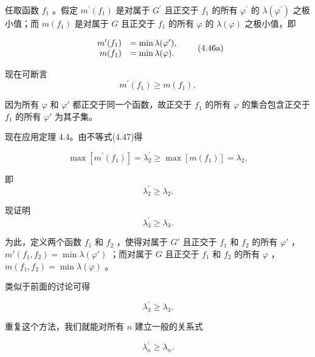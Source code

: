 任取函数 $f_{1}$ 。假定 $m^{\prime}(f_{1})$ 是对属于 $G^{\prime}$ 且正交于 $f_{1}$ 的所有 $\varphi^{\prime}$ 的 $\lambda (\varphi^{\prime})$ 之极小值；而 $m(f_{1})$ 是对属于 $G$ 且正交于 $f_{1}$ 的所有 $\varphi$ 的 $\lambda (\varphi)$ 之极小值，即

\begin{equation*}
\begin{array}{r l} m ^ {\prime} (f _ {1}) & = \min \lambda (\varphi^ {\prime}), \\ m (f _ {1}) & = \min \lambda (\varphi). \end{array}\tag{4.46a}
\end{equation*}

现在可断言
\begin{equation*}
m ^ {\prime} (f _ {1}) \geqslant m (f _ {1}),\tag{4.47}
\end{equation*}

因为所有 $\varphi$ 和 $\varphi'$ 都正交于同一个函数，故正交于 $f_{1}$ 的所有 $\varphi$ 的集合包含正交于 $f_{1}$ 的所有 $\varphi'$ 为其子集。

现在应用定理 4.4。由不等式(4.47)得

\begin{equation*}
\max \left[ m ^ {\prime} \left(f _ {1}\right) \right] = \lambda_ {2} ^ {\prime} \geqslant \max \left[ m \left(f _ {1}\right) \right] = \lambda_ {2},
\end{equation*}

即
\begin{equation*}
\lambda_ {2} ^ {\prime} \geqslant \lambda_ {2}.
\end{equation*}

现证明
\begin{equation*}
\lambda_ {3} ^ {\prime} \geqslant \lambda_ {3}.
\end{equation*}

为此，定义两个函数 $f_{1}$ 和 $f_{2}$ ，使得对属于 $G'$ 且正交于 $f_{1}$ 和 $f_{2}$ 的所有 $\varphi'$ ， $m'(f_1, f_2) = \min \lambda(\varphi')$ ；而对属于 $G$ 且正交于 $f_{1}$ 和 $f_{2}$ 的所有 $\varphi$ ， $m(f_1, f_2) = \min \lambda(\varphi)$ 。

类似于前面的讨论可得

\begin{equation*}
\lambda_ {3} ^ {\prime} \geqslant \lambda_ {3}.
\end{equation*}

重复这个方法，我们就能对所有 $n$ 建立一般的关系式

\begin{equation*}
\lambda_ {n} ^ {\prime} \geqslant \lambda_ {n}.
\end{equation*}

